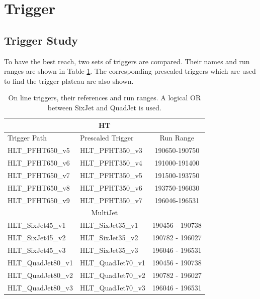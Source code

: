 \section{Trigger}
\label{sect:trigger}
\subsection{Trigger Study}
\label{sect:triggerstudy}
To have the best reach, two sets of triggers are compared. Their names and run ranges are shown in 
Table \ref{Tab.TriggerPaths}. The corresponding prescaled triggers which are used to find the trigger plateau are also shown.

\begin{table}[!htb]
\begin{center}
\caption{On line triggers, their references and run ranges. A logical OR between SixJet and QuadJet is used.}
\label{Tab.TriggerPaths}
\begin{tabular}{|l|l|c|}
\hline
\multicolumn{3}{|c|}{HT}\\
\hline
Trigger Path & Prescaled Trigger & Run Range \\\hline
HLT\_PFHT650\_v5 & HLT\_PFHT350\_v3 & 190650-190750\\
HLT\_PFHT650\_v6 & HLT\_PFHT350\_v4 & 191000-191400\\ 
HLT\_PFHT650\_v7 & HLT\_PFHT350\_v5 & 191500-193750\\ 
HLT\_PFHT650\_v8 & HLT\_PFHT350\_v6 & 193750-196030\\ 
HLT\_PFHT650\_v9 & HLT\_PFHT350\_v7 & 196046-196531\\ 
\hline
\multicolumn{3}{|c|}{MultiJet}\\
\hline
HLT\_SixJet45\_v1  & HLT\_SixJet35\_v1  & 190456 - 190738\\
HLT\_SixJet45\_v2  & HLT\_SixJet35\_v2  & 190782 - 196027\\
HLT\_SixJet45\_v3  & HLT\_SixJet35\_v3  & 196046 - 196531\\
HLT\_QuadJet80\_v1 & HLT\_QuadJet70\_v1 & 190456 - 190738\\
HLT\_QuadJet80\_v2 & HLT\_QuadJet70\_v2 & 190782 - 196027\\
HLT\_QuadJet80\_v3 & HLT\_QuadJet70\_v3 & 196046 - 196531\\
\hline
\end{tabular}
\end{center}
\end{table}

